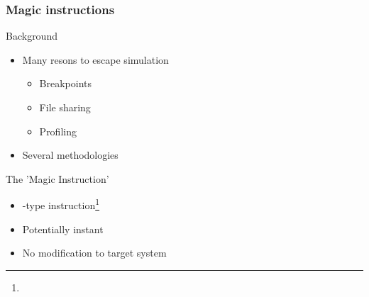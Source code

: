 
\begin{frame}
\frametitle{Magic instructions}

\begin{block}{Background}
	\begin{itemize}
		\item Many resons to escape simulation
		\begin{itemize}
			\item Breakpoints
			\item File sharing
			\item Profiling
		\end{itemize}
		\item Several methodologies
	\end{itemize}
\end{block}

\begin{block}{The 'Magic Instruction'}
	\begin{itemize}
	\item {}-type instruction\footnote{}
	\item Potentially instant
	\item No modification to target system
\end{itemize}
\end{block}

\end{frame}
